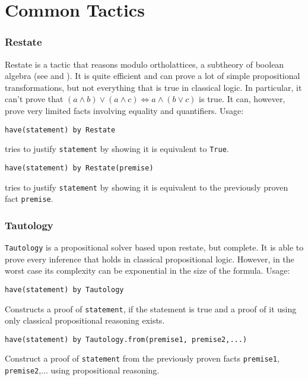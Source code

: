\section{Common Tactics}
\subsubsection*{Restate}

Restate is a tactic that reasons modulo ortholattices, a subtheory of boolean
algebra (see \cite{guilloudFormulaNormalizationsVerification2023} and
). It is quite efficient and can prove a lot of
simple propositional transformations, but not everything that is true in
classical logic. In particular, it can't prove that $(a\land b) \lor (a \land c)
\iff a \land (b \lor c)$ is true. It can, however, prove very limited facts
involving equality and quantifiers. Usage:

\begin{lstlisting}[language=lisa]
  have(statement) by Restate
\end{lstlisting}
tries to justify \lstinline|statement| by showing it is equivalent to
\lstinline|True|.

\begin{lstlisting}[language=lisa]
  have(statement) by Restate(premise)
\end{lstlisting}
tries to justify \lstinline|statement| by showing it is equivalent to the
previously proven fact \lstinline|premise|.

\subsubsection*{Tautology}\label{tact:Tautology} 

\lstinline|Tautology| is a propositional solver based upon restate, but
complete. It is able to prove every inference that holds in classical
propositional logic. However, in the worst case its complexity can be
exponential in the size of the formula. Usage:

\begin{lstlisting}[language=lisa]
  have(statement) by Tautology
\end{lstlisting}
Constructs a proof of \lstinline|statement|, if the statement is true and a
proof of it using only classical propositional reasoning exists.

\begin{lstlisting}[language=lisa]
  have(statement) by Tautology.from(premise1, premise2,...)
\end{lstlisting}
Construct a proof of \lstinline|statement| from the previously proven facts
\lstinline|premise1|, \lstinline|premise2|,... using propositional reasoning.


